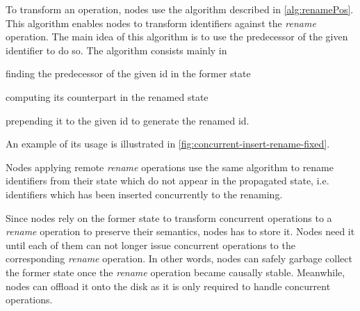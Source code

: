 \documentclass[sigplan,10pt]{acmart}
\newcommand{\ie}{i.e. }
\begin{document}
To transform an operation, nodes use the algorithm described in \autoref{alg:renamePos}.
This algorithm enables nodes to transform identifiers against the \emph{rename} operation.
The main idea of this algorithm is to use the predecessor of the given identifier to do so.
The algorithm consists mainly in
\begin{enumerate*}
    \item finding the predecessor of the given id in the former state
    \item computing its counterpart in the renamed state
    \item prepending it to the given id to generate the renamed id.
\end{enumerate*}
An example of its usage is illustrated in \autoref{fig:concurrent-insert-rename-fixed}.

Nodes applying remote \emph{rename} operations use the same algorithm to rename identifiers from their state which do not appear in the propagated state, \ie identifiers which has been inserted concurrently to the renaming.

Since nodes rely on the former state to transform concurrent operations to a \emph{rename} operation to preserve their semantics, nodes has to store it.
Nodes need it until each of them can not longer issue concurrent operations to the corresponding \emph{rename} operation.
In other words, nodes can safely garbage collect the former state once the \emph{rename} operation became causally stable.
Meanwhile, nodes can offload it onto the disk as it is only required to handle concurrent operations.
\end{document}
